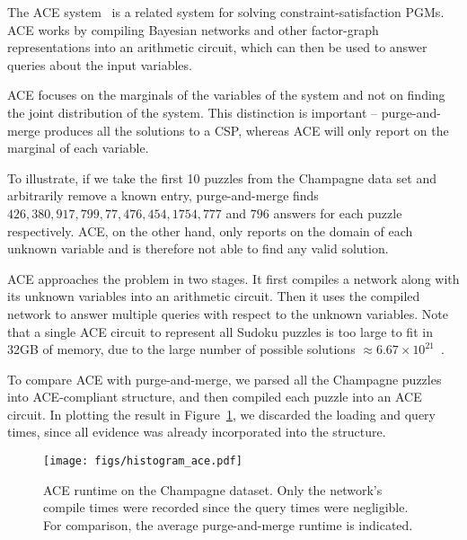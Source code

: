 \documentclass{ieeeaccess}
\begin{document}
{	%
	The ACE system~\cite{acewebsite} is a related system for solving constraint-satisfaction PGMs. ACE works by compiling Bayesian networks and other factor-graph representations into an arithmetic circuit, which can then be used to answer queries about the input variables. 
	
	ACE focuses on the marginals of the variables of the system and not on finding the joint distribution of the system. This distinction is important -- purge-and-merge produces all the solutions to a CSP, whereas ACE will only report on the marginal of each variable. 
	
	To illustrate, if we take the first 10 puzzles from the Champagne data set and arbitrarily remove a known entry, purge-and-merge finds $426, 380, 917, 799, 77, 476, 454, 1754, 777$ and $796$ answers for each puzzle respectively. ACE, on the other hand, only reports on the domain of each unknown variable and is therefore not able to find any valid solution.
	
	ACE approaches the problem in two stages. It first compiles a network along with its unknown variables into an arithmetic circuit. Then it uses the compiled network to answer multiple queries with respect to the unknown variables. Note that a single ACE circuit to represent all Sudoku puzzles is too large to fit in 32GB of memory, due to the large number of possible solutions $\approx 6.67 \times 10^{21}$~\cite{numberofsudokus}.
	
	To compare ACE with purge-and-merge, we parsed all the Champagne puzzles into ACE-compliant structure, and then compiled each puzzle into an ACE circuit. In plotting the result in Figure~\ref{fig-histogram_ace}, we discarded the loading and query times, since all evidence was already incorporated into the structure.
	
	\begin{figure}[h!]
		\centering
		\texttt{[image: figs/histogram\_ace.pdf]}
		\caption{ACE runtime on the Champagne dataset. Only the network's compile times were recorded since the query times were negligible. For comparison, the average purge-and-merge runtime is indicated.}\label{fig-histogram_ace}
	\end{figure}
	
	
	
}
\end{document}
